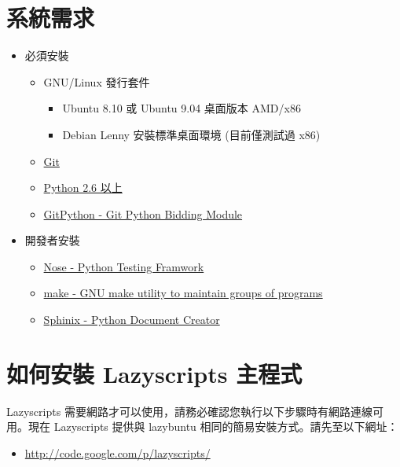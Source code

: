 \documentclass[letterpaper,10pt,english]{manual}
\begin{document}
\section{系統需求}
\begin{itemize}
\item {} 
必須安裝
\begin{itemize}
\item {} 
GNU/Linux 發行套件
\begin{itemize}
\item {} 
Ubuntu 8.10 或 Ubuntu 9.04 桌面版本 AMD/x86

\item {} 
Debian Lenny 安裝標準桌面環境 (目前僅測試過 x86)

\end{itemize}

\item {} 
\href{http://git-scm.com/}{Git}

\item {} 
\href{http://www.python.org}{Python 2.6 以上}

\item {} 
\href{http://gitorious.org/projects/git-python/}{GitPython - Git Python Bidding Module}

\end{itemize}

\item {} 
開發者安裝
\begin{itemize}
\item {} 
\href{http://code.google.com/p/python-nose/}{Nose - Python Testing Framwork}

\item {} 
\href{http://www.gnu.org/software/automake/}{make - GNU make utility to maintain groups of programs}

\item {} 
\href{http://sphinx.pocoo.org/index.html}{Sphinix - Python Document Creator}

\end{itemize}

\end{itemize}


\section{如何安裝 Lazyscripts 主程式}

Lazyscripts 需要網路才可以使用，請務必確認您執行以下步驟時有網路連線可用。現在 Lazyscripts 提供與 lazybuntu 相同的簡易安裝方式。請先至以下網址：
\begin{itemize}
\item {} 
\href{http://code.google.com/p/lazyscripts/}{http://code.google.com/p/lazyscripts/}

\end{itemize}
\end{document}
